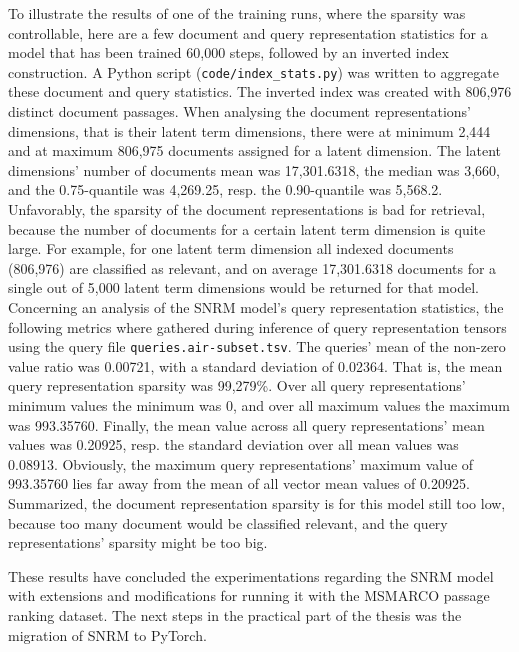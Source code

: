 To illustrate the results of one of the training runs, where the sparsity was controllable, 
    here are a few document and query representation statistics for a model that has been 
    trained 60,000 steps, followed by an inverted index construction.
A Python script (\texttt{code/index\_stats.py}) was written to aggregate these document and
    query statistics.
The inverted index was created with 806,976 distinct document passages.
When analysing the document representations' dimensions, that is their latent term dimensions,
    there were at minimum 2,444 and at maximum 806,975 documents assigned for a latent dimension.
The latent dimensions' number of documents mean was 17,301.6318, the median was 3,660, and the
    0.75-quantile was 4,269.25, resp. the 0.90-quantile was 5,568.2.
Unfavorably, the sparsity of the document representations is bad for retrieval, because
    the number of documents for a certain latent term dimension is quite large.
For example, for one latent term dimension all indexed documents (806,976) are classified as relevant,
    and on average 17,301.6318 documents for a single out of 5,000 latent term dimensions
    would be returned for that model.\\
Concerning an analysis of the SNRM model's query representation statistics,
    the following metrics where gathered during inference of query representation tensors
    using the query file \texttt{queries.air-subset.tsv}.
The queries' mean of the non-zero value ratio was 0.00721, with a standard deviation of
    0.02364.
That is, the mean query representation sparsity was 99,279\%.
Over all query representations' minimum values the minimum was 0, and over all
    maximum values the maximum was 993.35760.
Finally, the mean value across all query representations' mean values was 0.20925, 
    resp. the standard deviation over all mean values was 0.08913.
Obviously, the maximum query representations' maximum value of 993.35760 lies far away from the mean of
    all vector mean values of 0.20925.
Summarized, the document representation sparsity is for this model still too low, because 
    too many document would be classified relevant, and the query representations' sparsity might be too big.

These results have concluded the experimentations regarding the SNRM model with extensions and modifications
    for running it with the MSMARCO passage ranking dataset.
The next steps in the practical part of the thesis was the migration of SNRM to PyTorch.
















    



